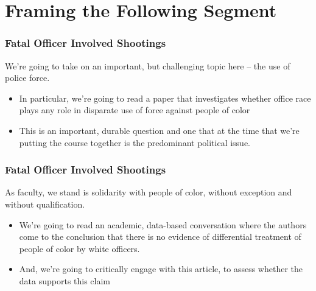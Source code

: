 \documentclass[12pt, block=fill]{beamer}
\begin{document}
\begin{frame}

\end{frame}






\section{Framing the Following Segment}

\begin{frame}
  \frametitle{Fatal Officer Involved Shootings}

  We're going to take on an important, but challenging topic here -- the use of police force.

  \begin{itemize}
      \item In particular, we're going to read a paper that investigates whether office race plays any role in disparate use of force against people of color
    \item This is an important, durable question and one that at the time that we're putting the course together is the predominant political issue.
  \end{itemize}
\end{frame} 

\begin{frame}
  \frametitle{Fatal Officer Involved Shootings} 
  As faculty, we stand is solidarity with people of color, without exception and without qualification.

  \begin{itemize}
    \item We're going to read an academic, data-based conversation where the authors come to the conclusion that there is no evidence of differential treatment of people of color by white officers.
    \item And, we're going to critically engage with this article, to assess whether the data supports this claim 
  \end{itemize}
\end{frame}
\end{document}
